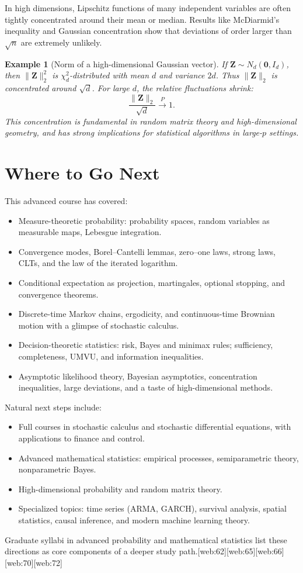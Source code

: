 \documentclass[11pt,a4paper]{article}
\newtheorem{example}{Example}[section]
\numberwithin{equation}{section}
\begin{document}
In high dimensions, Lipschitz functions of many independent variables are often tightly concentrated around their mean or median. 
Results like McDiarmid's inequality and Gaussian concentration show that deviations of order larger than $\sqrt{n}$ are extremely unlikely.

\begin{example}[Norm of a high-dimensional Gaussian vector]
If $\bm{Z}\sim N_d(\bm{0},I_d)$, then $\|\bm{Z}\|_2^2$ is $\chi^2_d$-distributed with mean $d$ and variance $2d$. 
Thus $\|\bm{Z}\|_2$ is concentrated around $\sqrt{d}$. 
For large $d$, the relative fluctuations shrink:
\[
\frac{\|\bm{Z}\|_2}{\sqrt{d}} \xrightarrow{P} 1.
\]
This concentration is fundamental in random matrix theory and high-dimensional geometry, and has strong implications for statistical algorithms in large-$p$ settings.

\end{example}

\newpage

\section{Where to Go Next}

This advanced course has covered:
\begin{itemize}
    \item Measure-theoretic probability: probability spaces, random variables as measurable maps, Lebesgue integration.
    \item Convergence modes, Borel--Cantelli lemmas, zero--one laws, strong laws, CLTs, and the law of the iterated logarithm.
    \item Conditional expectation as projection, martingales, optional stopping, and convergence theorems.
    \item Discrete-time Markov chains, ergodicity, and continuous-time Brownian motion with a glimpse of stochastic calculus.
    \item Decision-theoretic statistics: risk, Bayes and minimax rules; sufficiency, completeness, UMVU, and information inequalities.
    \item Asymptotic likelihood theory, Bayesian asymptotics, concentration inequalities, large deviations, and a taste of high-dimensional methods.
\end{itemize}

Natural next steps include:
\begin{itemize}
    \item Full courses in stochastic calculus and stochastic differential equations, with applications to finance and control.
    \item Advanced mathematical statistics: empirical processes, semiparametric theory, nonparametric Bayes.
    \item High-dimensional probability and random matrix theory.
    \item Specialized topics: time series (ARMA, GARCH), survival analysis, spatial statistics, causal inference, and modern machine learning theory.
\end{itemize}

Graduate syllabi in advanced probability and mathematical statistics list these directions as core components of a deeper study path.[web:62][web:65][web:66][web:70][web:72]
\end{document}
